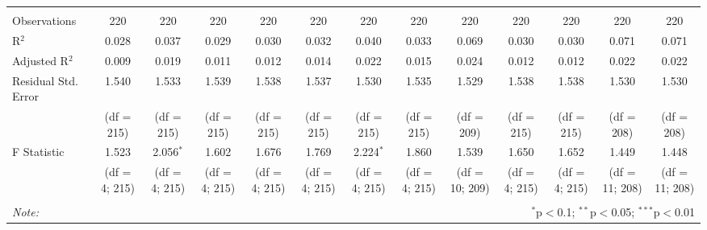 \begin{subtables}
\begin{table}[H]
\begin{adjustbox}{width=\textwidth}
\begin{tabular}{@{\extracolsep{5pt}}lcccccccccccc}
  & & & & & & & & & & & & \\ 
\hline \\[-1.8ex] 
Observations & 220 & 220 & 220 & 220 & 220 & 220 & 220 & 220 & 220 & 220 & 220 & 220 \\ 
R$^{2}$ & 0.028 & 0.037 & 0.029 & 0.030 & 0.032 & 0.040 & 0.033 & 0.069 & 0.030 & 0.030 & 0.071 & 0.071 \\ 
Adjusted R$^{2}$ & 0.009 & 0.019 & 0.011 & 0.012 & 0.014 & 0.022 & 0.015 & 0.024 & 0.012 & 0.012 & 0.022 & 0.022 \\ 
Residual Std. Error & 1.540  & 1.533 & 1.539 & 1.538 & 1.537  & 1.530  & 1.535  & 1.529  & 1.538  & 1.538  & 1.530  & 1.530 \\ 
& (df = 215) & (df = 215) & (df = 215) & (df = 215) & (df = 215) & (df = 215) & (df = 215) & (df = 209) & (df = 215) & (df = 215) & (df = 208) & (df = 208) \\
F Statistic & 1.523  & 2.056$^{*}$ & 1.602  & 1.676  & 1.769 & 2.224$^{*}$  & 1.860  & 1.539  & 1.650  & 1.652  & 1.449  & 1.448  \\ 
&  (df = 4; 215) & (df = 4; 215) & (df = 4; 215) & (df = 4; 215) & (df = 4; 215) & (df = 4; 215) & (df = 4; 215) & (df = 10; 209) & (df = 4; 215) & (df = 4; 215) & (df = 11; 208) & (df = 11; 208) \\
\hline 
\hline \\[-1.8ex] 
\textit{Note:}  & \multicolumn{12}{r}{$^{*}$p$<$0.1; $^{**}$p$<$0.05; $^{***}$p$<$0.01} \\ 
\end{tabular} 
\end{adjustbox}
\end{table} 
\end{subtables}

